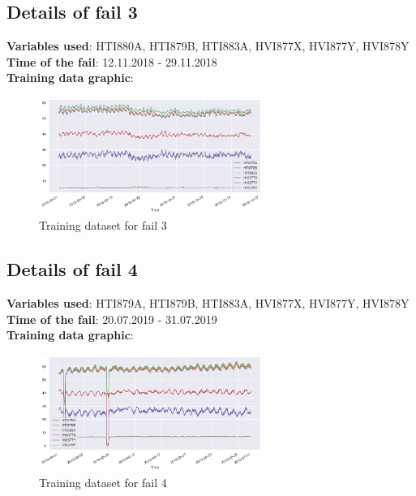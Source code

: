 \documentclass[11pt,twoside]{article}
\begin{document}
\subsection{Details of fail 3}
\textbf{Variables used}: HTI880A, HTI879B, HTI883A, HVI877X, HVI877Y, HVI878Y\\
\textbf{Time of the fail}: 12.11.2018 - 29.11.2018\\
\textbf{Training data graphic}:  
\begin{figure}[h!]
\centering
\includegraphics[width=0.65\textwidth]{train_fail2.png}
\caption{Training dataset for fail 3}\label{screenshots}
\end{figure}

\subsection{Details of fail 4}
\textbf{Variables used}: HTI879A, HTI879B, HTI883A, HVI877X, HVI877Y, HVI878Y\\
\textbf{Time of the fail}: 20.07.2019 - 31.07.2019\\
\textbf{Training data graphic}:  
\begin{figure}[h!]
\centering
\includegraphics[width=0.65\textwidth]{train_fail3.png}
\caption{Training dataset for fail 4}\label{screenshots}
\end{figure}
\end{document}
